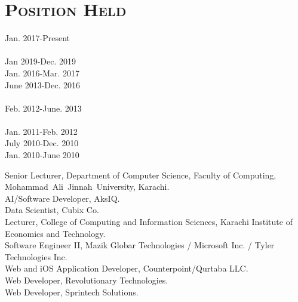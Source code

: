 \documentclass[a4paper, 10pt]{article}
\begin{document}
\section*{\normalfont\textsc{Position Held}}
\hfill\begin{minipage}{0.23\textwidth}
Jan. 2017-Present\textcolor{lightgray}{\dotfill}\\\\
Jan 2019-Dec. 2019\textcolor{lightgray}{\dotfill}\\
Jan. 2016-Mar. 2017\textcolor{lightgray}{\dotfill}\\
June 2013-Dec. 2016\textcolor{lightgray}{\dotfill}\\\\
Feb. 2012-June. 2013\textcolor{lightgray}{\dotfill}\\\\
Jan. 2011-Feb. 2012\textcolor{lightgray}{\dotfill}\\
July 2010-Dec. 2010\textcolor{lightgray}{\dotfill}\\
Jan. 2010-June 2010\textcolor{lightgray}{\dotfill}\\
\end{minipage}
\begin{minipage}{0.74\textwidth}
Senior Lecturer, Department of Computer Science, Faculty of Computing, Mohammad~Ali~Jinnah~University, Karachi.\\
AI/Software Developer, AksIQ.\\
Data Scientist, Cubix Co.\\
Lecturer, College of Computing and Information Sciences, Karachi Institute of Economics and Technology.\\
Software Engineer II, Mazik Globar Technologies / Microsoft Inc. / Tyler Technologies Inc.\\
Web and iOS Application Developer, Counterpoint/Qurtaba LLC.\\
Web Developer, Revolutionary Technologies.\\
Web Developer, Sprintech Solutions.\\
\end{minipage}



\end{document}
